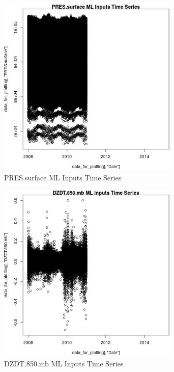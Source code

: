 \begin{figure} 
\centering  
\includegraphics[width=0.77\textwidth]{Code_Outputs/ML_input_report_ML_input_PM25_Step5_part_d_de_duplicated_aves_ML_input_PRES.surfaceTS.jpg} 
\caption{\label{fig:ML_input_report_ML_input_PM25_Step5_part_d_de_duplicated_aves_ML_inputPRES.surfaceTS}PRES.surface ML Inputs Time Series} 
\end{figure} 
 

\begin{figure} 
\centering  
\includegraphics[width=0.77\textwidth]{Code_Outputs/ML_input_report_ML_input_PM25_Step5_part_d_de_duplicated_aves_ML_input_DZDT.850.mbTS.jpg} 
\caption{\label{fig:ML_input_report_ML_input_PM25_Step5_part_d_de_duplicated_aves_ML_inputDZDT.850.mbTS}DZDT.850.mb ML Inputs Time Series} 
\end{figure} 
 


